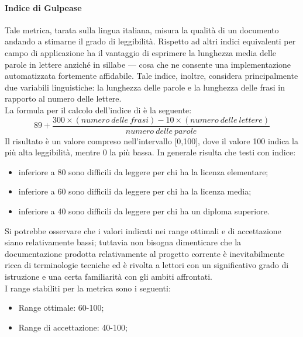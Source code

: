 			\paragraph{Indice di Gulpease}
			Tale metrica, tarata sulla lingua italiana, misura la qualità di un documento andando a stimarne il grado di leggibilità. Rispetto ad altri indici equivalenti per campo di applicazione ha il vantaggio di esprimere la lunghezza media delle parole in lettere anziché in sillabe --- cosa che ne consente una implementazione automatizzata fortemente affidabile. Tale indice, inoltre, considera principalmente due variabili linguistiche: la lunghezza delle parole e la lunghezza delle frasi in rapporto al numero delle lettere.
			\\La formula per il calcolo dell'indice di  è la seguente:
				\begin{equation}
					89+\frac{300\times(numero~delle~frasi)-10\times(numero~delle~lettere)}{numero~delle~parole}
				\end{equation}
			Il risultato è un valore compreso nell'intervallo [0,100], dove il valore 100 indica la più alta leggibilità, mentre 0 la più bassa. In generale risulta che testi con indice:
				\begin{itemize}
					\item inferiore a 80 sono difficili da leggere per chi ha la licenza elementare;
					\item inferiore a 60 sono difficili da leggere per chi ha la licenza media;
					\item inferiore a 40 sono difficili da leggere per chi ha un diploma superiore.	
				\end{itemize}
			Si potrebbe osservare che i valori indicati nei range ottimali e di accettazione siano relativamente bassi; tuttavia non bisogna dimenticare che la documentazione prodotta relativamente al progetto corrente è inevitabilmente ricca di terminologie tecniche ed è rivolta a lettori con un significativo grado di istruzione e una certa familiarità con gli ambiti affrontati.
			\\I range stabiliti per la metrica sono i seguenti:
				\begin{itemize}
					\item Range ottimale: 60-100;
					\item Range di accettazione: 40-100;
				\end{itemize}
				

